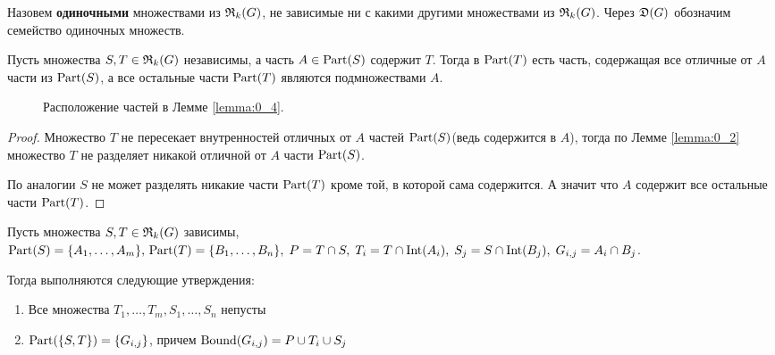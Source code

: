 \begin{df*}
	Назовем \textbf{одиночными} множествами из $\mathfrak{R}_k(G)$, не зависимые ни с какими другими множествами из $\mathfrak{R}_k(G)$.
	Через $\mathfrak{D}(G)$ обозначим семейство одиночных множеств. 
\end{df*}

\begin{customlm}{4} \label{lemma:0_4}
	Пусть множества $S, T \in \mathfrak{R}_k(G)$ независимы, а часть  $A \in \operatorname{Part}(S)$ содержит  $T$.
	Тогда в  $\operatorname{Part}(T)$ есть часть, содержащая все отличные от  $A$ части из $\operatorname{Part}(S)$, а все остальные части $\operatorname{Part}(T)$ являются подмножествами  $A$.
\end{customlm}

\begin{figure}[ht]
    \centering
	\caption{Расположение частей в Лемме \ref{lemma:0_4}.}
    \label{fig:lemma_0_4}
\end{figure}

\begin{proof}
	Множество $T$ не пересекает внутренностей отличных от  $A$ частей  $\operatorname{Part}(S)$(ведь содержится в $A$), тогда по Лемме \ref{lemma:0_2} множество $T$ не разделяет никакой отличной от  $A$ части $\operatorname{Part}(S)$.

	По аналогии $S$ не может разделять никакие части  $\operatorname{Part}(T)$ кроме той, в которой сама содержится. А значит что $A$ содержит все остальные части  $\operatorname{Part}(T)$.

\end{proof}

\begin{customlm}{5} \label{lemma:0_5}
	Пусть множества $S, T \in \mathfrak{R}_k(G)$ зависимы,  $\operatorname{Part}(S) = \{A_1, \ldots, A_m\}, \, \operatorname{Part}(T) = \{B_1, \ldots, B_n\}, \; P = T \cap S, \; T_i = T \cap \operatorname{Int}(A_i), \; S_j = S \cap \operatorname{Int}(B_j), \; G_{i, j} = A_i \cap B_j$.

	Тогда выполняются следующие утверждения:

	\begin{enumerate}
		\item Все множества $T_1, \ldots, T_m, S_1, \ldots, S_n$ непусты
		\item $\operatorname{Part}(\{S, T\}) = \{G_{i, j}\}$, причем  $\operatorname{Bound}(G_{i, j}) = P \cup T_i \cup S_j$
	\end{enumerate}

\end{customlm}


